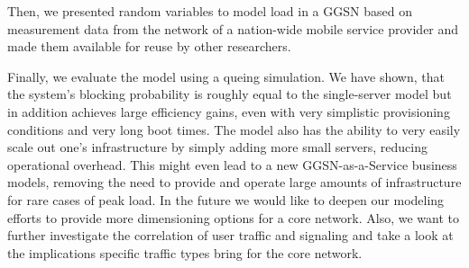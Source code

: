 Then, we presented random variables to model load in a \gls{GGSN} based on measurement data from the network of a nation-wide mobile service provider and made them available for reuse by other researchers.

Finally, we evaluate the model using a queing simulation. We have shown, that the system's blocking probability is roughly equal to the single-server model but in addition achieves large efficiency gains, even with very simplistic provisioning conditions and very long boot times. The model also has the ability to very easily scale out one's infrastructure by simply adding more small servers, reducing operational overhead. This might even lead to a new \gls{GGSN}-as-a-Service business models, removing the need to provide and operate large amounts of infrastructure for rare cases of peak load. 
In the future we would like to deepen our modeling efforts to provide more dimensioning options for a core network. Also, we want to further investigate the correlation of user traffic and signaling and take a look at the implications specific traffic types bring for the core network. 